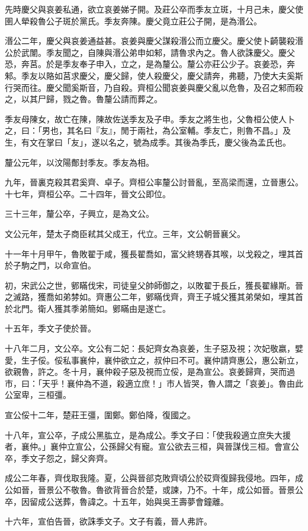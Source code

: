 \begin{pinyinscope}
先時慶父與哀姜私通，欲立哀姜娣子開。及莊公卒而季友立斑，十月己未，慶父使圉人犖殺魯公子斑於黨氏。季友奔陳。慶父竟立莊公子開，是為湣公。

湣公二年，慶父與哀姜通益甚。哀姜與慶父謀殺湣公而立慶父。慶父使卜齮襲殺湣公於武闈。季友聞之，自陳與湣公弟申如邾，請魯求內之。魯人欲誅慶父。慶父恐，奔莒。於是季友奉子申入，立之，是為釐公。釐公亦莊公少子。哀姜恐，奔邾。季友以賂如莒求慶父，慶父歸，使人殺慶父，慶父請奔，弗聽，乃使大夫奚斯行哭而往。慶父聞奚斯音，乃自殺。齊桓公聞哀姜與慶父亂以危魯，及召之邾而殺之，以其尸歸，戮之魯。魯釐公請而葬之。

季友母陳女，故亡在陳，陳故佐送季友及子申。季友之將生也，父魯桓公使人卜之，曰：「男也，其名曰『友』，閒于兩社，為公室輔。季友亡，則魯不昌。」及生，有文在掌曰「友」，遂以名之，號為成季。其後為季氏，慶父後為孟氏也。

釐公元年，以汶陽鄪封季友。季友為相。

九年，晉裏克殺其君奚齊、卓子。齊桓公率釐公討晉亂，至高梁而還，立晉惠公。十七年，齊桓公卒。二十四年，晉文公即位。

三十三年，釐公卒，子興立，是為文公。

文公元年，楚太子商臣弒其父成王，代立。三年，文公朝晉襄父。

十一年十月甲午，魯敗翟于咸，獲長翟喬如，富父終甥舂其喉，以戈殺之，埋其首於子駒之門，以命宣伯。

初，宋武公之世，鄋瞞伐宋，司徒皇父帥師御之，以敗翟于長丘，獲長翟緣斯。晉之滅路，獲喬如弟棼如。齊惠公二年，鄋瞞伐齊，齊王子城父獲其弟榮如，埋其首於北門。衛人獲其季弟簡如。鄋瞞由是遂亡。

十五年，季文子使於晉。

十八年二月，文公卒。文公有二妃：長妃齊女為哀姜，生子惡及視；次妃敬嬴，嬖愛，生子俀。俀私事襄仲，襄仲欲立之，叔仲曰不可。襄仲請齊惠公，惠公新立，欲親魯，許之。冬十月，襄仲殺子惡及視而立俀，是為宣公。哀姜歸齊，哭而過市，曰：「天乎！襄仲為不道，殺適立庶！」市人皆哭，魯人謂之「哀姜」。魯由此公室卑，三桓彊。

宣公俀十二年，楚莊王彊，圍鄭。鄭伯降，復國之。

十八年，宣公卒，子成公黑肱立，是為成公。季文子曰：「使我殺適立庶失大援者，襄仲。」襄仲立宣公，公孫歸父有寵。宣公欲去三桓，與晉謀伐三桓。會宣公卒，季文子怨之，歸父奔齊。

成公二年春，齊伐取我隆。夏，公與晉郤克敗齊頃公於砹齊復歸我侵地。四年，成公如晉，晉景公不敬魯。魯欲背晉合於楚，或諫，乃不。十年，成公如晉。晉景公卒，因留成公送葬，魯諱之。十五年，始與吳王壽夢會鐘離。

十六年，宣伯告晉，欲誅季文子。文子有義，晉人弗許。


\end{pinyinscope}
